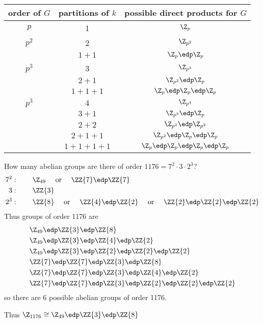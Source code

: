 \begin{example} \ \vspace{-3em}
\begin{center}
    \begin{tabular}{|c|c|c|}
        \hline
        order of \(G\)  & partitions of \(k\)   & possible direct products for \(G\) \\ \hline
        \(p\)           & 1                     & \(\Z_{p}\)              \\ \hline
        \(p^2\)         & 2                     & \(\Z_{p^2}\)            \\
                        & $1 + 1$               & \(\Z_{p}\edp\Z_{p}\)  \\ \hline
        \(p^3\)         & 3                     & \(\Z_{p^3}\) \\
                        & $2 + 1$           &  \(\Z_{p^2}\edp \Z_{p}\) \\
                        & \(1+1+1\)         & \(\Z_{p}\edp \Z_{p}\edp \Z_{p}\) \\ \hline
        \(p^3\)         & \(4\)             & \(\Z_{p^4}\) \\
                        & $3 + 1$           &  \(\Z_{p^3}\edp \Z_{p}\) \\
                        & $2 + 2$           &  \(\Z_{p^2}\edp \Z_{p^2}\) \\
                        & $2 + 1 + 1$       &  \(\Z_{p^2}\edp \Z_{p}\edp \Z_p\) \\
                        & \(1+1+1+1\)         & \(\Z_{p}\edp \Z_{p}\edp \Z_{p}\edp \Z_p\) \\ \hline
    \end{tabular}
\end{center}
\end{example}

\begin{example}
    How many abelian groups are there of order \(1176 = 7^2\cdot 3\cdot 2^3\)?
    \begin{align*}
        7^2 &: \qquad \Z_{49} \quad \text{ or } \quad \ZZ{7}\edp\ZZ{7} \\
        3   &: \qquad \ZZ{3} \\
        2^3 &: \qquad \ZZ{8} \quad \text{ or } \quad \ZZ{4} \edp \ZZ{2} \quad \text{ or } \quad \ZZ{2} \edp \ZZ{2} \edp \ZZ{2}
    \end{align*}
    Thus groups of order 1176 are
    \begin{align*}
        &\Z_{49} \edp \ZZ{3} \edp \ZZ{8} \\
        &\Z_{49} \edp \ZZ{3} \edp \ZZ{4} \edp \ZZ{2} \\
        &\Z_{49} \edp \ZZ{3} \edp \ZZ{2} \edp \ZZ{2} \edp \ZZ{2} \\
        &\ZZ{7} \edp \ZZ{7} \edp \ZZ{3} \edp \ZZ{8} \\
        &\ZZ{7} \edp \ZZ{7} \edp \ZZ{3} \edp \ZZ{4} \edp \ZZ{2} \\
        &\ZZ{7} \edp \ZZ{7} \edp \ZZ{3} \edp \ZZ{2} \edp \ZZ{2} \edp \ZZ{2}
    \end{align*} so there are 6 possible abelian groups of order 1176.

    Thus \(\Z_{1176}\cong \Z_{49} \edp \ZZ{3} \edp \ZZ{8}\)
\end{example}